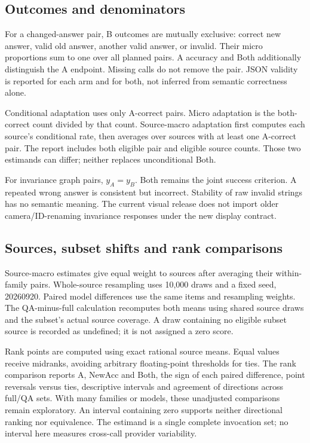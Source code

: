 \documentclass[10pt,twocolumn,letterpaper]{article}
\begin{document}
\subsection{Outcomes and denominators}
For a changed-answer pair, B outcomes are mutually exclusive:
correct new answer, valid old answer, another valid answer, or invalid.
Their micro proportions sum to one over all planned pairs.
A accuracy and Both additionally distinguish the A endpoint.
Missing calls do not remove the pair. JSON validity is reported for
each arm and for both, not inferred from semantic correctness alone.

Conditional adaptation uses only A-correct pairs. Micro adaptation is
the both-correct count divided by that count. Source-macro adaptation
first computes each source's conditional rate, then averages over
sources with at least one A-correct pair. The report includes both
eligible pair and eligible source counts. Those two estimands can
differ; neither replaces unconditional Both.

For invariance graph pairs, $y_A=y_B$. Both remains the joint success
criterion. A repeated wrong answer is consistent but incorrect.
Stability of raw invalid strings has no semantic meaning. The current
visual release does not import older camera/ID-renaming invariance
responses under the new display contract.

\subsection{Sources, subset shifts and rank comparisons}
Source-macro estimates give equal weight to sources after averaging
their within-family pairs. Whole-source resampling uses 10,000 draws
and a fixed seed, 20260920. Paired model differences use the same
items and resampling weights. The QA-minus-full calculation recomputes
both means using shared source draws and the subset's actual source
coverage. A draw containing no eligible subset source is recorded
as undefined; it is not assigned a zero score.

Rank points are computed using exact rational source means. Equal
values receive midranks, avoiding arbitrary floating-point thresholds
for ties. The rank comparison reports A, NewAcc and Both, the sign
of each paired difference, point reversals versus ties, descriptive
intervals and agreement of directions across full/QA sets. With many
families or models, these unadjusted comparisons remain exploratory.
An interval containing zero supports neither directional ranking nor
equivalence. The estimand is a single complete invocation set; no
interval here measures cross-call provider variability.
\end{document}

